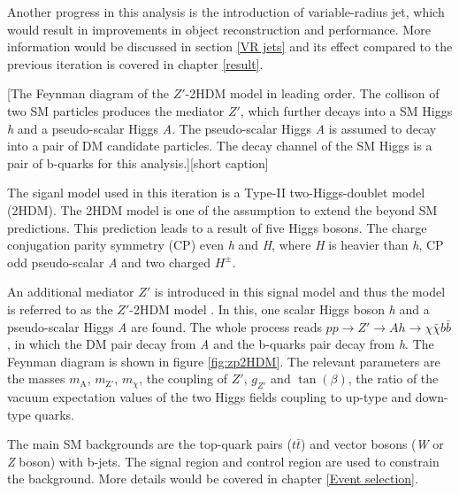 \documentclass[class=NCU_thesis, crop=false]{standalone}
\begin{document}
	Another progress in this analysis is the introduction of variable-radius jet, which would result in improvements in object reconstruction and performance. More information would be discussed in section \ref{VR jets} and its effect compared to the previous iteration is covered in chapter \ref{result}.
	
	[The Feynman diagram of the $Z'$-2HDM model in leading order. The collison of two SM particles produces the mediator $Z'$, which further decays into a SM Higgs \textit{h} and a pseudo-scalar Higgs \textit{A}. The pseudo-scalar Higgs \textit{A} is assumed to decay into a pair of DM candidate particles. The decay channel of the SM Higgs is a pair of b-quarks for this analysis.][short caption]
	
	The siganl model used in this iteration is a Type-II two-Higgs-doublet model (2HDM). The 2HDM model is one of the assumption to extend the beyond SM predictions. This prediction leads to a result of five Higgs bosons. The charge conjugation parity symmetry (CP) even \textit{h} and \textit{H}, where \textit{H} is heavier than \textit{h}, CP odd pseudo-scalar \textit{A} and two charged $H^{\pm}$.
	
	An additional mediator $Z'$ is introduced in this signal model and thus the model is referred to as the $Z'$-2HDM model \cite{1707.01302}. In this, one scalar Higgs boson \textit{h} and a pseudo-scalar Higgs \textit{A} are found. The whole process reads $pp \rightarrow Z' \rightarrow Ah \rightarrow \chi \bar{\chi} b \bar{b}$, in which the DM pair decay from \textit{A} and the b-quarks pair decay from \textit{h}. The Feynman diagram is shown in figure \ref{fig:zp2HDM}. The relevant parameters are the masses $m_{\mathrm{A}}$, $m_{\mathrm{Z'}}$, $m_{\chi}$, the coupling of $Z'$, $g_{Z'}$ and $\tan(\beta)$, the ratio of the vacuum expectation values of the two Higgs fields coupling to up-type and down-type quarks.
	
	The main SM backgrounds are the top-quark pairs ($t\bar{t}$) and vector bosons (\textit{W} or \textit{Z} boson) with b-jets. The signal region and control region are used to constrain the background. More details would be covered in chapter \ref{Event selection}.
	
\end{document}
